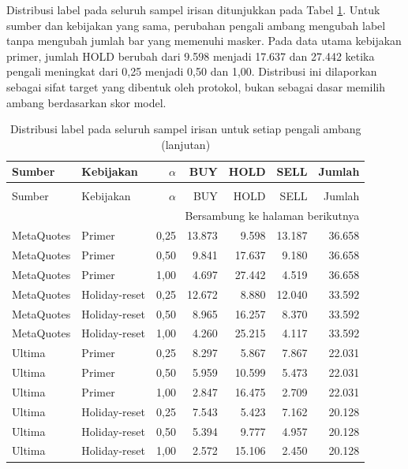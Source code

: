 Distribusi label pada seluruh sampel irisan ditunjukkan pada Tabel \ref{tab:hasil-distribusi-ambang}. Untuk sumber dan kebijakan yang sama, perubahan pengali ambang mengubah label tanpa mengubah jumlah bar yang memenuhi masker. Pada data utama kebijakan primer, jumlah HOLD berubah dari 9.598 menjadi 17.637 dan 27.442 ketika pengali meningkat dari 0,25 menjadi 0,50 dan 1,00. Distribusi ini dilaporkan sebagai sifat target yang dibentuk oleh protokol, bukan sebagai dasar memilih ambang berdasarkan skor model.


\begingroup
\small
\setlength{\tabcolsep}{4pt}
\begin{longtable}{llrrrrr}
\caption{Distribusi label pada seluruh sampel irisan untuk setiap pengali ambang}\label{tab:hasil-distribusi-ambang}\\
\toprule
Sumber & Kebijakan & $\alpha$ & BUY & HOLD & SELL & Jumlah \\
\midrule
\endfirsthead
\caption[]{Distribusi label pada seluruh sampel irisan untuk setiap pengali ambang (lanjutan)}\\
\toprule
Sumber & Kebijakan & $\alpha$ & BUY & HOLD & SELL & Jumlah \\
\midrule
\endhead
\midrule
\multicolumn{7}{r}{Bersambung ke halaman berikutnya} \\
\endfoot
\endlastfoot
MetaQuotes & Primer & 0,25 & 13.873 & 9.598 & 13.187 & 36.658 \\
MetaQuotes & Primer & 0,50 & 9.841 & 17.637 & 9.180 & 36.658 \\
MetaQuotes & Primer & 1,00 & 4.697 & 27.442 & 4.519 & 36.658 \\
MetaQuotes & Holiday-reset & 0,25 & 12.672 & 8.880 & 12.040 & 33.592 \\
MetaQuotes & Holiday-reset & 0,50 & 8.965 & 16.257 & 8.370 & 33.592 \\
MetaQuotes & Holiday-reset & 1,00 & 4.260 & 25.215 & 4.117 & 33.592 \\
Ultima & Primer & 0,25 & 8.297 & 5.867 & 7.867 & 22.031 \\
Ultima & Primer & 0,50 & 5.959 & 10.599 & 5.473 & 22.031 \\
Ultima & Primer & 1,00 & 2.847 & 16.475 & 2.709 & 22.031 \\
Ultima & Holiday-reset & 0,25 & 7.543 & 5.423 & 7.162 & 20.128 \\
Ultima & Holiday-reset & 0,50 & 5.394 & 9.777 & 4.957 & 20.128 \\
Ultima & Holiday-reset & 1,00 & 2.572 & 15.106 & 2.450 & 20.128 \\
\bottomrule
\end{longtable}
\endgroup


